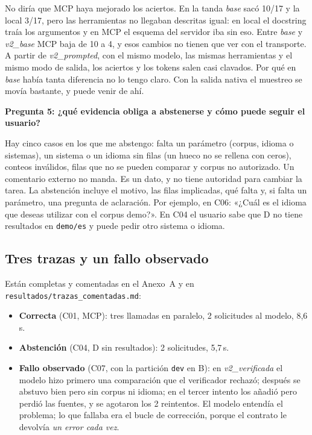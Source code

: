 \documentclass[10pt,a4paper]{article}
\newcommand{\cod}[1]{\texttt{\small #1}}
\newcommand{\pregunta}[1]{\par\medskip\noindent\colorbox{azul!10}{\parbox{\dimexpr\linewidth-2\fboxsep}{\textbf{#1}}}\par\smallskip}
\begin{document}
No diría que MCP haya mejorado los aciertos. En la tanda \emph{base} sacó 10/17 y la local 3/17, pero las herramientas no llegaban descritas igual: en local el docstring traía los argumentos y en MCP el esquema del servidor iba sin eso. Entre \emph{base} y \emph{v2\_base} MCP baja de 10 a 4, y esos cambios no tienen que ver con el transporte. A partir de \emph{v2\_prompted}, con el mismo modelo, las mismas herramientas y el mismo modo de salida, los aciertos y los tokens salen casi clavados. Por qué en \emph{base} había tanta diferencia no lo tengo claro. Con la salida nativa el muestreo se movía bastante, y puede venir de ahí.

\pregunta{Pregunta 5: ¿qué evidencia obliga a abstenerse y cómo puede seguir el usuario?}
Hay cinco casos en los que me abstengo: falta un parámetro (corpus, idioma o sistemas), un sistema o un idioma sin filas (un hueco no se rellena con ceros), conteos inválidos, filas que no se pueden comparar y corpus no autorizado. Un comentario externo no manda. Es un dato, y no tiene autoridad para cambiar la tarea.
La abstención incluye el motivo, las filas implicadas, qué falta y, si falta un parámetro, una pregunta de aclaración. Por ejemplo, en C06: «¿Cuál es el idioma que deseas utilizar con el corpus demo?». En C04 el usuario sabe que D no tiene resultados en \cod{demo/es} y puede pedir otro sistema o idioma.

\subsection{Tres trazas y un fallo observado}
Están completas y comentadas en el Anexo~A y en \cod{resultados/trazas\_comentadas.md}:
\begin{itemize}
\item \textbf{Correcta} (C01, MCP): tres llamadas en paralelo, 2 solicitudes al modelo, 8,6\,s.
\item \textbf{Abstención} (C04, D sin resultados): 2 solicitudes, 5,7\,s.
\item \textbf{Fallo observado} (C07, con la partición \cod{dev} en B): en \emph{v2\_verificada} el modelo hizo primero una comparación que el verificador rechazó; después se abstuvo bien pero sin corpus ni idioma; en el tercer intento los añadió pero perdió las fuentes, y se agotaron los 2 reintentos. El modelo entendía el problema; lo que fallaba era el bucle de corrección, porque el contrato le devolvía \emph{un error cada vez}.
\end{itemize}
\end{document}
